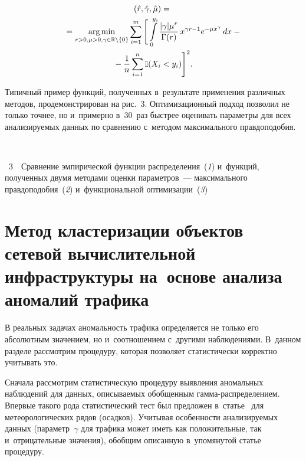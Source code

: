 \begin{multicols}{2}
{}


\noindent
\begin{multline*}
    \left(\hat{r}, \hat{\gamma}, \hat{\mu}\right)={}\\
    {}=\mathop{\mathrm{arg}\,\mathrm{min}}\limits_{r>0, \mu > 0, 
\gamma\in\mathbb{R}\setminus\{0\}} \sum\limits_{i=1}^m \Bigg[\int\limits_0^{y_i} 
\displaystyle\frac{\displaystyle |\gamma|\mu^r\mathstrut}{\displaystyle \Gamma(r)\mathstrut}\,x^{\gamma r - 1} e^{-\mu x^{\gamma}}\,dx - {}\\
{}-
\displaystyle\frac{\displaystyle 1\mathstrut}{\displaystyle n\mathstrut} \sum\limits_{i=1}^n \mathbb{I}({X_i < y_i})\Bigg]^2.
\end{multline*}
 \vspace*{-15pt}


Типичный пример функций, полученных в~результате применения различных методов, 
продемонстрирован на рис.~3. %
Оптимизационный под\-ход поз\-во\-лил не 
толь\-ко точ\-нее, но и~примерно в~30~раз быст\-рее
оценивать па\-ра\-мет\-ры для всех ана\-ли\-зи\-ру\-емых данных по срав\-не\-нию с~методом 
максимального прав\-до\-по\-до\-бия. 

{ \begin{center}  %
 \vspace*{-6pt}
    \mbox{%
 \epsfxsize=79mm 
 }

\end{center}
\vspace*{-3pt}

\noindent
{{\figurename~3}\ \ \small{Сравнение эмпирической функции распределения~(\textit{1}) 
и~функций, полученных двумя методами оценки па\-ра\-мет\-ров~--- максимального 
прав\-до\-по\-до\-бия~(\textit{2}) и~функциональной оптимизации~(\textit{3})}
}}

\vspace*{-6pt}

\addtocounter{figure}{1}

\section{Метод кластеризации объектов сетевой вычислительной инфраструктуры на~основе анализа аномалий трафика}

В реальных задачах ано\-маль\-ность трафика определяется не только его абсолютным 
значением, но и~соотношением с~другими наблюдениями. В~данном разделе рас\-смот\-рим 
процедуру, которая поз\-во\-ля\-ет ста\-ти\-сти\-че\-ски корректно учитывать это.

Сначала рас\-смот\-рим ста\-ти\-сти\-че\-скую процедуру выявления аномальных наблюдений для 
данных, опи\-сы\-ва\-емых обобщенным гам\-ма-рас\-пре\-де\-ле\-ни\-ем. Впервые такого рода 
статистический тест был пред\-ло\-жен в~статье~\cite{Gorshenin2020} для 
метеорологических рядов (осад\-ков). Учитывая особенности ана\-ли\-зи\-ру\-емых данных 
(па\-ра\-метр~$\gamma$ для трафика может иметь как положительные, так 
и~отрицательные значения), обоб\-щим описанную в~упомянутой \mbox{статье} про\-це\-дуру.


\end{multicols}
